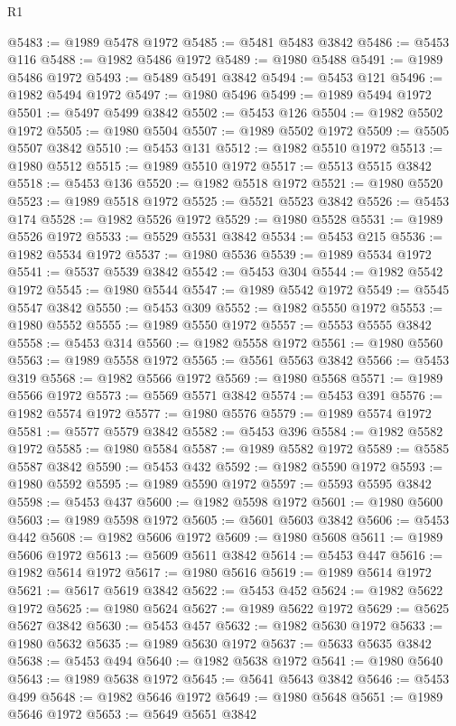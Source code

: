 \begin{lexlean}{R1}
\begin{coremodule}
@5483 := @1989 @5478 @1972
@5485 := @5481 @5483 @3842
@5486 := @5453 @116
@5488 := @1982 @5486 @1972
@5489 := @1980 @5488
@5491 := @1989 @5486 @1972
@5493 := @5489 @5491 @3842
@5494 := @5453 @121
@5496 := @1982 @5494 @1972
@5497 := @1980 @5496
@5499 := @1989 @5494 @1972
@5501 := @5497 @5499 @3842
@5502 := @5453 @126
@5504 := @1982 @5502 @1972
@5505 := @1980 @5504
@5507 := @1989 @5502 @1972
@5509 := @5505 @5507 @3842
@5510 := @5453 @131
@5512 := @1982 @5510 @1972
@5513 := @1980 @5512
@5515 := @1989 @5510 @1972
@5517 := @5513 @5515 @3842
@5518 := @5453 @136
@5520 := @1982 @5518 @1972
@5521 := @1980 @5520
@5523 := @1989 @5518 @1972
@5525 := @5521 @5523 @3842
@5526 := @5453 @174
@5528 := @1982 @5526 @1972
@5529 := @1980 @5528
@5531 := @1989 @5526 @1972
@5533 := @5529 @5531 @3842
@5534 := @5453 @215
@5536 := @1982 @5534 @1972
@5537 := @1980 @5536
@5539 := @1989 @5534 @1972
@5541 := @5537 @5539 @3842
@5542 := @5453 @304
@5544 := @1982 @5542 @1972
@5545 := @1980 @5544
@5547 := @1989 @5542 @1972
@5549 := @5545 @5547 @3842
@5550 := @5453 @309
@5552 := @1982 @5550 @1972
@5553 := @1980 @5552
@5555 := @1989 @5550 @1972
@5557 := @5553 @5555 @3842
@5558 := @5453 @314
@5560 := @1982 @5558 @1972
@5561 := @1980 @5560
@5563 := @1989 @5558 @1972
@5565 := @5561 @5563 @3842
@5566 := @5453 @319
@5568 := @1982 @5566 @1972
@5569 := @1980 @5568
@5571 := @1989 @5566 @1972
@5573 := @5569 @5571 @3842
@5574 := @5453 @391
@5576 := @1982 @5574 @1972
@5577 := @1980 @5576
@5579 := @1989 @5574 @1972
@5581 := @5577 @5579 @3842
@5582 := @5453 @396
@5584 := @1982 @5582 @1972
@5585 := @1980 @5584
@5587 := @1989 @5582 @1972
@5589 := @5585 @5587 @3842
@5590 := @5453 @432
@5592 := @1982 @5590 @1972
@5593 := @1980 @5592
@5595 := @1989 @5590 @1972
@5597 := @5593 @5595 @3842
@5598 := @5453 @437
@5600 := @1982 @5598 @1972
@5601 := @1980 @5600
@5603 := @1989 @5598 @1972
@5605 := @5601 @5603 @3842
@5606 := @5453 @442
@5608 := @1982 @5606 @1972
@5609 := @1980 @5608
@5611 := @1989 @5606 @1972
@5613 := @5609 @5611 @3842
@5614 := @5453 @447
@5616 := @1982 @5614 @1972
@5617 := @1980 @5616
@5619 := @1989 @5614 @1972
@5621 := @5617 @5619 @3842
@5622 := @5453 @452
@5624 := @1982 @5622 @1972
@5625 := @1980 @5624
@5627 := @1989 @5622 @1972
@5629 := @5625 @5627 @3842
@5630 := @5453 @457
@5632 := @1982 @5630 @1972
@5633 := @1980 @5632
@5635 := @1989 @5630 @1972
@5637 := @5633 @5635 @3842
@5638 := @5453 @494
@5640 := @1982 @5638 @1972
@5641 := @1980 @5640
@5643 := @1989 @5638 @1972
@5645 := @5641 @5643 @3842
@5646 := @5453 @499
@5648 := @1982 @5646 @1972
@5649 := @1980 @5648
@5651 := @1989 @5646 @1972
@5653 := @5649 @5651 @3842

\end{coremodule}
\end{lexlean}
